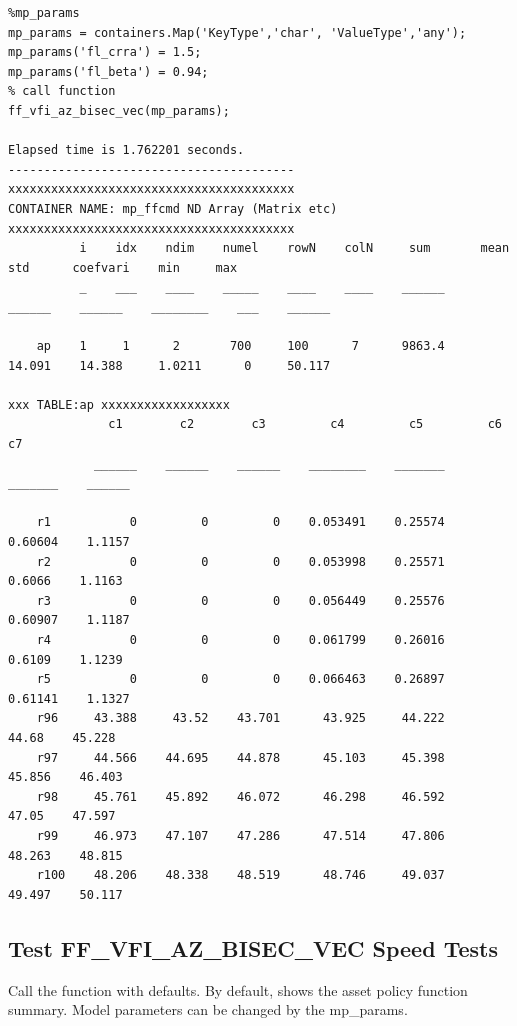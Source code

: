 \documentclass[
]{book}
\begin{document}
\begin{verbatim}
%mp_params
mp_params = containers.Map('KeyType','char', 'ValueType','any');
mp_params('fl_crra') = 1.5;
mp_params('fl_beta') = 0.94;
% call function
ff_vfi_az_bisec_vec(mp_params);

Elapsed time is 1.762201 seconds.
----------------------------------------
xxxxxxxxxxxxxxxxxxxxxxxxxxxxxxxxxxxxxxxx
CONTAINER NAME: mp_ffcmd ND Array (Matrix etc)
xxxxxxxxxxxxxxxxxxxxxxxxxxxxxxxxxxxxxxxx
          i    idx    ndim    numel    rowN    colN     sum       mean      std      coefvari    min     max  
          _    ___    ____    _____    ____    ____    ______    ______    ______    ________    ___    ______

    ap    1     1      2       700     100      7      9863.4    14.091    14.388     1.0211      0     50.117

xxx TABLE:ap xxxxxxxxxxxxxxxxxx
              c1        c2        c3         c4         c5         c6         c7  
            ______    ______    ______    ________    _______    _______    ______

    r1           0         0         0    0.053491    0.25574    0.60604    1.1157
    r2           0         0         0    0.053998    0.25571     0.6066    1.1163
    r3           0         0         0    0.056449    0.25576    0.60907    1.1187
    r4           0         0         0    0.061799    0.26016     0.6109    1.1239
    r5           0         0         0    0.066463    0.26897    0.61141    1.1327
    r96     43.388     43.52    43.701      43.925     44.222      44.68    45.228
    r97     44.566    44.695    44.878      45.103     45.398     45.856    46.403
    r98     45.761    45.892    46.072      46.298     46.592      47.05    47.597
    r99     46.973    47.107    47.286      47.514     47.806     48.263    48.815
    r100    48.206    48.338    48.519      48.746     49.037     49.497    50.117
\end{verbatim}

\hypertarget{test-ff_vfi_az_bisec_vec-speed-tests-2}{%
\subsection{Test FF\_VFI\_AZ\_BISEC\_VEC Speed Tests}\label{test-ff_vfi_az_bisec_vec-speed-tests-2}}

Call the function with defaults. By default, shows the asset policy
function summary. Model parameters can be changed by the mp\_params.
\end{document}
